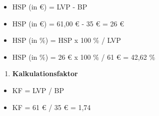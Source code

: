 \begin{itemize}
\item
  HSP (in €) = LVP - BP
\item
  HSP (in €) = 61,00 € - 35 € = 26 €
\item
  HSP (in \%) = HSP x 100 \% / LVP
\item
  HSP (in \%) = 26 € x 100 \% / 61 € = 42,62 \%
\end{itemize}

\begin{enumerate}
\def\labelenumi{\alph{enumi})}
\setcounter{enumi}{2}
\item
  \textbf{Kalkulationsfaktor}
\end{enumerate}

\begin{itemize}
\item
  KF = LVP / BP
\item
  KF = 61 € / 35 € = 1,74
\end{itemize}

